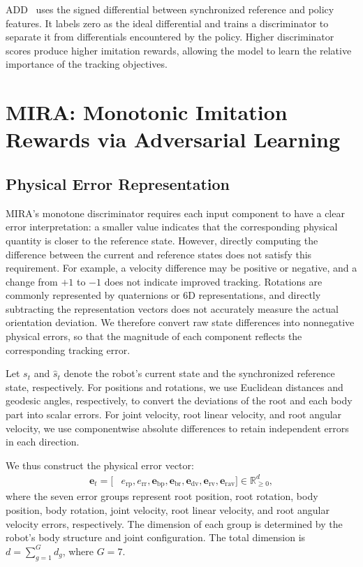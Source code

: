 \documentclass[letterpaper, 10pt, conference]{ieeeconf}
\begin{document}
ADD~\cite{zhang2025add} uses the signed differential between
synchronized reference and policy features. It labels zero as the ideal
differential and trains a discriminator to separate it from
differentials encountered by the policy. Higher discriminator scores
produce higher imitation rewards, allowing the model to learn the
relative importance of the tracking objectives.

\section{MIRA: Monotonic Imitation Rewards via Adversarial Learning}
\label{sec:mira}

\subsection{Physical Error Representation}
\label{sec:physical_errors}

MIRA's monotone discriminator requires each input component to have a clear
error interpretation: a smaller value indicates that the corresponding
physical quantity is closer to the reference state. However, directly
computing the difference between the current and reference states does not satisfy
this requirement. For example, a velocity difference may be positive or
negative, and a change from $+1$ to $-1$ does not indicate improved
tracking. Rotations are commonly represented by quaternions or 6D
representations, and directly subtracting the representation vectors does
not accurately measure the actual orientation deviation. We therefore
convert raw state differences into nonnegative physical errors, so that
the magnitude of each component reflects the corresponding tracking error.

Let $s_t$ and $\hat{s}_t$ denote the robot's current state and the
synchronized reference state, respectively. For positions and rotations,
we use Euclidean distances and geodesic angles, respectively, to convert
the deviations of the root and each body part into scalar errors. For
joint velocity, root linear velocity, and root angular velocity, we use
componentwise absolute differences to retain independent errors in each
direction.

We thus construct the physical error vector:
\begin{equation}
\begin{aligned}
\mathbf e_t = \bigl[
&e_{\mathrm{rp}}, e_{\mathrm{rr}},
\mathbf e_{\mathrm{bp}}, \mathbf e_{\mathrm{br}},
\mathbf e_{\mathrm{dv}}, \mathbf e_{\mathrm{rv}},
\mathbf e_{\mathrm{rav}}
\bigr]
\in \mathbb R_{\geq 0}^{d},
\end{aligned}
\label{eq:physical_errors}
\end{equation}
where the seven error groups represent root position, root rotation, body
position, body rotation, joint velocity, root linear velocity, and root
angular velocity errors, respectively. The dimension of each group is
determined by the robot's body structure and joint configuration. The
total dimension is $d=\sum_{g=1}^{G}d_g$, where $G=7$.
\end{document}
